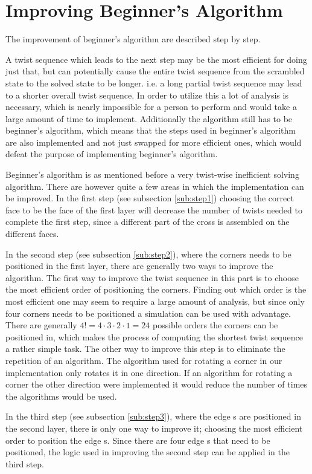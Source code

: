 \section{Improving Beginner's Algorithm}
The improvement of beginner's algorithm are described step by step. 

A twist sequence which leads to the next step may be the most efficient for doing just that, but can potentially cause the entire twist sequence from the scrambled state to the solved state to be longer. 
i.e. a long partial twist sequence may lead to a shorter overall twist sequence. In order to utilize this a lot of analysis is necessary, which is nearly impossible for a person to perform and would take a large amount of time to implement.
Additionally the algorithm still has to be beginner's algorithm, which means that the steps used in beginner's algorithm are also implemented and not just swapped for more efficient ones, which would defeat the purpose of implementing beginner's algorithm.


Beginner's algorithm is as mentioned before a very twist-wise inefficient solving algorithm. 
There are however quite a few areas in which the implementation can be improved.
In the first step (see subsection \ref{sub:step1}) choosing the correct face to be the face of the first layer will decrease the number of twists needed to complete the first step, since a different part of the cross is assembled on the different faces.

In the second step (see subsection \ref{sub:step2}), where the corners needs to be positioned in the first layer, there are generally two ways to improve the algorithm.
The first way to improve the twist sequence in this part is to choose the most efficient order of positioning the corners.
Finding out which order is the most efficient one may seem to require a large amount of analysis, but since only four corners needs to be positioned a simulation can be used with advantage.
There are generally $4! = 4 \cdot 3 \cdot 2 \cdot 1 = 24$ possible orders the corners can be positioned in, which makes the process of computing the shortest twist sequence a rather simple task.
The other way to improve this step is to eliminate the repetition of an algorithm. 
The algorithm used for rotating a corner \cpiece{} in our implementation only rotates it in one direction. 
If an algorithm for rotating a corner \cpiece{} the other direction were implemented it would reduce the number of times the algorithms would be used.

In the third step (see subsection \ref{sub:step3}), where the edge \cpiece{}s are positioned in the second layer, there is only one way to improve it; choosing the most efficient order to position the edge \cpiece{}s. Since there are four edge \cpiece{}s that need to be positioned, the logic used in improving the second step can be applied in the third step.

